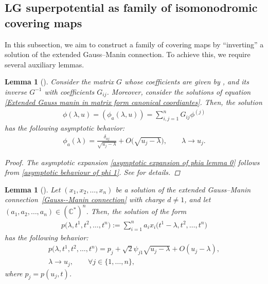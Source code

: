 \documentclass[11pt]{article}
\numberwithin{equation}{section}
\numberwithin{equation}{section}
\newtheorem{Lemma}[Theorem]{Lemma}
\begin{document}
\subsection{LG superpotential as family of isomonodromic covering maps}

In this subsection, we aim to construct a family of covering maps by ``inverting'' a solution of the extended Gauss--Manin connection. To achieve this, we require several auxiliary lemmas.

\begin{Lemma}[\cite{B.Dubrovin3}]
Consider the matrix \( G \) whose coefficients are given by
,
and its inverse \( G^{-1} \) with coefficients \( G_{ij} \). Moreover, consider the solutions  of equation \eqref{Extended Gauss manin in matrix form canonical coordiantes}. Then, the solution
\begin{gather}\label{phi solution normalized by Gij}
\phi(\lambda,u) = (\phi_a(\lambda,u)) = \sum_{i,j=1}^{n} G_{ij} \phi^{(j)}
\end{gather}
has the following asymptotic behavior:
\begin{gather}\label{asymptotic expansion of phia lemma 0}
 \phi_{a}(\lambda) = \frac{\delta_{aj}}{\sqrt{u_j - \lambda}} + O\bigl(\sqrt{u_j - \lambda}\bigr), \qquad \lambda \to u_j.
\end{gather}

\begin{proof}
The asymptotic expansion \eqref{asymptotic expansion of phia lemma 0} follows from \eqref{asymptotic behaviour of phi 1}. See \cite[Lemma 5.7]{B.Dubrovin3} for details.
\end{proof}
\end{Lemma}


\begin{Lemma}[\cite{B.Dubrovin3}]\label{lemma primitive form}
Let \( (x_1, x_2, \dots, x_n) \) be a solution of the extended Gauss--Manin connection~\eqref{Gauss--Manin connection} with charge \( d \neq 1 \), and let \( (a_1, a_2, \dots, a_n) \in (\mathbb{C}^{*})^n \). Then, the solution of the form
\begin{gather}\label{primitive of volume form}
p\bigl(\lambda, t^1, t^2, \dots, t^n\bigr) := \sum_{i=1}^n a_i x_i\bigl(t^1 - \lambda, t^2, \dots, t^n\bigr)
\end{gather}
has the following behavior:
\begin{gather}
p\bigl(\lambda, t^1, t^2, \dots, t^n\bigr) = p_j + \sqrt{2} \psi_{j1} \sqrt{u_j - \lambda} + O(u_j - \lambda), \nonumber\\
 \lambda \to u_j, \qquad
 \forall j \in \{1, \dots, n\},\label{asymptotic behaviour at the branch locus of p}
\end{gather}
where \( p_j = p(u_j, t) \).
\end{Lemma}
\end{document}
